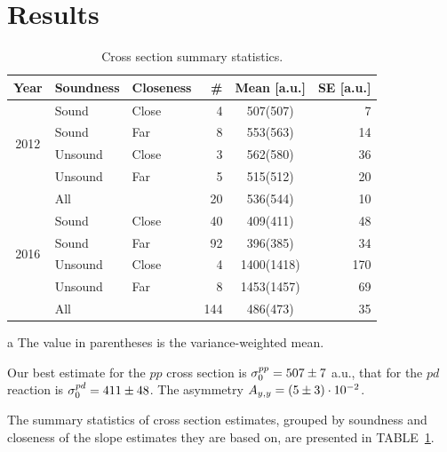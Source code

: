 \documentclass[reprint, superscriptaddress]{revtex4-1}
\newcommand{\vp}[2]{#1\cdot10^{#2}}
\begin{document}
\section{Results}
\begin{table}
\centering
\begin{threeparttable}
\caption{Cross section summary statistics. \label{tbl:CS-all}}
\begin{tabular}{c|llrcr}
\hline\hline
Year						& Soundness		& Closeness		& \#		& Mean\tnote{a} [a.u.]	& SE [a.u.] \\
\hline
\multirow{4}{*}{2012}		& Sound			& Close			& 4			& 507(507)				& 7  \\
							& Sound			& Far			& 8			& 553(563)				& 14 \\
							& Unsound		& Close			& 3			& 562(580)				& 36 \\
							& Unsound		& Far			& 5			& 515(512)				& 20 \\
							& All			& 				& 20		& 536(544)				& 10 \\
\hline					
\multirow{4}{*}{2016}		& Sound			& Close			& 40		& 409(411)				& 48 \\
							& Sound			& Far			& 92		& 396(385)				& 34 \\
							& Unsound		& Close			& 4			& 1400(1418)			& 170\\
							& Unsound		& Far			& 8			& 1453(1457)			& 69 \\
							& All			& 				& 144		& 486(473)				& 35 \\
\hline\hline
\end{tabular}
\begin{tablenotes}
\item[a] The value in parentheses is the variance-weighted mean.
\end{tablenotes}
\end{threeparttable}
\end{table}

Our best estimate for the $pp$ cross section is $\CS[0]^{pp} = 507 \pm 7$ a.u., that for the $pd$ reaction is $\CS[0]^{pd} = 411 \pm 48$. The asymmetry $\Ayy = \vp{(5 \pm 3)}{-2}$. %

The summary statistics of cross section estimates, grouped by soundness and closeness of the slope estimates they are based on, are presented in TABLE~\ref{tbl:CS-all}.
\end{document}
